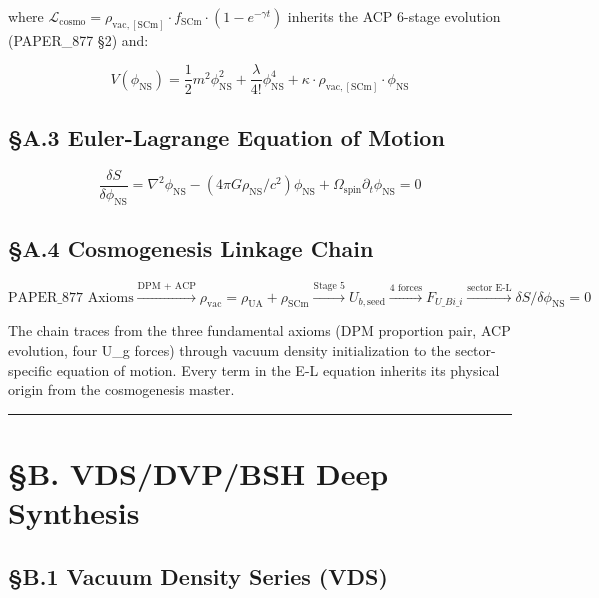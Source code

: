 \documentclass[12pt,a4paper]{article}
\begin{document}
where $\mathcal{L}_{\mathrm{cosmo}} = \rho_{\mathrm{vac,[SCm]}} \cdot f_{\mathrm{SCm}} \cdot (1 - e^{-\gamma t})$ inherits the ACP 6-stage evolution (PAPER\_877 \S{}2) and:

\begin{equation}
V(\phi_{\mathrm{NS}}) = \frac{1}{2} m^2 \phi_{\mathrm{NS}}^2 + \frac{\lambda}{4!} \phi_{\mathrm{NS}}^4 + \kappa \cdot \rho_{\mathrm{vac,[SCm]}} \cdot \phi_{\mathrm{NS}}
\end{equation}

\subsection{\S{}A.3 Euler-Lagrange Equation of Motion}

\begin{equation}
\boxed{\frac{\delta S}{\delta \phi_{\mathrm{NS}}} = \nabla^2 \phi_{\mathrm{NS}} - (4\pi G \rho_{\mathrm{NS}}/c^2)\phi_{\mathrm{NS}} + \Omega_{\mathrm{spin}} \partial_t \phi_{\mathrm{NS}} = 0}
\end{equation}

\subsection{\S{}A.4 Cosmogenesis Linkage Chain}

\begin{equation}
\text{PAPER\_877 Axioms} \xrightarrow{\text{DPM + ACP}} \rho_{\mathrm{vac}} = \rho_{\mathrm{UA}} + \rho_{\mathrm{SCm}} \xrightarrow{\text{Stage 5}} U_{b,\mathrm{seed}} \xrightarrow{\text{4 forces}} F_{U\_Bi\_i} \xrightarrow{\text{sector E-L}} \delta S/\delta \phi_{\mathrm{NS}} = 0
\end{equation}

The chain traces from the three fundamental axioms (DPM proportion pair, ACP evolution, four U\_g forces) through vacuum density initialization to the sector-specific equation of motion. Every term in the E-L equation inherits its physical origin from the cosmogenesis master.

\medskip\hrule\medskip

\section{\S{}B. VDS/DVP/BSH Deep Synthesis}

\subsection{\S{}B.1 Vacuum Density Series (VDS)}
\end{document}
